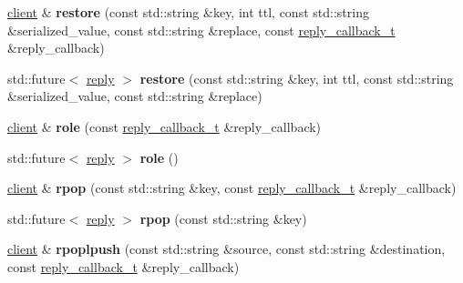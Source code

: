 \begin{DoxyCompactItemize}
\hyperlink{classcpp__redis_1_1client}{client} \& {\bfseries restore} (const std\+::string \&key, int ttl, const std\+::string \&serialized\+\_\+value, const std\+::string \&replace, const \hyperlink{classcpp__redis_1_1client_a061a1140d36d2eaeda82b09a0bb3f9f2}{reply\+\_\+callback\+\_\+t} \&reply\+\_\+callback)
\item 
\mbox{\label{classcpp__redis_1_1client_a15b2c81c1d5b86f3490ecfb154b29ad1}} 
std\+::future$<$ \hyperlink{classcpp__redis_1_1reply}{reply} $>$ {\bfseries restore} (const std\+::string \&key, int ttl, const std\+::string \&serialized\+\_\+value, const std\+::string \&replace)
\item 
\mbox{\label{classcpp__redis_1_1client_a73bc7e0a747d437e5f9ac233a152c9bc}} 
\hyperlink{classcpp__redis_1_1client}{client} \& {\bfseries role} (const \hyperlink{classcpp__redis_1_1client_a061a1140d36d2eaeda82b09a0bb3f9f2}{reply\+\_\+callback\+\_\+t} \&reply\+\_\+callback)
\item 
\mbox{\label{classcpp__redis_1_1client_a34abe0819734b88704d89972b651e7ed}} 
std\+::future$<$ \hyperlink{classcpp__redis_1_1reply}{reply} $>$ {\bfseries role} ()
\item 
\mbox{\label{classcpp__redis_1_1client_aa29c7c00278934074e3cdbf70c0bb9cc}} 
\hyperlink{classcpp__redis_1_1client}{client} \& {\bfseries rpop} (const std\+::string \&key, const \hyperlink{classcpp__redis_1_1client_a061a1140d36d2eaeda82b09a0bb3f9f2}{reply\+\_\+callback\+\_\+t} \&reply\+\_\+callback)
\item 
\mbox{\label{classcpp__redis_1_1client_a7a2ea6e56ce9fa430cfc44ada77d960b}} 
std\+::future$<$ \hyperlink{classcpp__redis_1_1reply}{reply} $>$ {\bfseries rpop} (const std\+::string \&key)
\item 
\mbox{\label{classcpp__redis_1_1client_a1d50b5d26753768d79ebbe04f3615c7a}} 
\hyperlink{classcpp__redis_1_1client}{client} \& {\bfseries rpoplpush} (const std\+::string \&source, const std\+::string \&destination, const \hyperlink{classcpp__redis_1_1client_a061a1140d36d2eaeda82b09a0bb3f9f2}{reply\+\_\+callback\+\_\+t} \&reply\+\_\+callback)
\item 

\end{DoxyCompactItemize}
